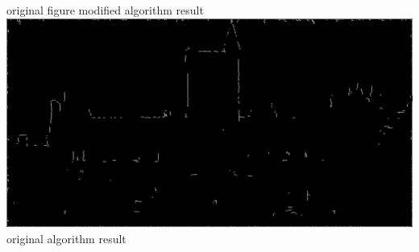 \documentclass[10pt,twocolumn,letterpaper]{article}
\begin{document}
original figure \hspace{45pt} modified algorithm result\\
\includegraphics[scale=0.1]{result_original_noise_60_3.png}\\
original algorithm result\\
\\
\end{document}
